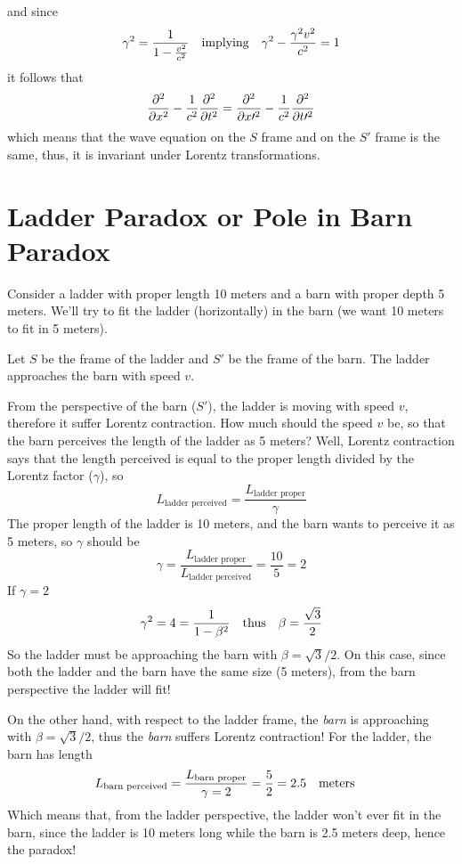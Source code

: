 \documentclass[oneside, 10pt, notitlepage]{book}
\begin{document}
and since
\begin{equation}\gamma^2 = \frac{1}{1-\frac{v^2}{c^2}} \qq{implying} \gamma^2 - \frac{\gamma^2 v^2}{c^2}=1\end{equation}
it follows that
\begin{equation}\pdv[2]{x} - \frac{1}{c^2}\pdv[2]{t} = \pdv[2]{x{\prime}} - \frac{1}{c^2}\pdv[2]{t{\prime}}\end{equation}
which means that the wave equation on the \(S\) frame and on the \(S{\prime}\) frame is the same, thus, it is invariant under Lorentz transformations. 

\section{Ladder Paradox or Pole in Barn Paradox}

Consider a ladder with proper length 10 meters and a barn with proper depth 5 meters. We'll try to fit the ladder (horizontally) in the barn (we want 10 meters to fit in 5 meters).

Let \(S\) be the frame of the ladder and \(S{\prime}\) be the frame of the barn. The ladder approaches the barn with speed \(v\). 

From the perspective of the barn (\(S{\prime}\)), the ladder is moving with speed \(v\), therefore it suffer Lorentz contraction. How much should the speed \(v\) be, so that the barn perceives the length of the ladder as 5 meters?  
Well, Lorentz contraction says that the length perceived is equal to the proper length divided by the Lorentz factor (\(\gamma\)), so
\begin{equation}L_{\text{ladder perceived}} = \frac{L_{\text{ladder proper}}}{\gamma}\end{equation}
The proper length of the ladder is 10 meters, and the barn wants to perceive it as 5 meters, so \(\gamma\) should be
\begin{equation}\gamma = \frac{L_{\text{ladder proper}}}{L_{\text{ladder perceived}}} = \frac{10}{5} = 2\end{equation}
If \(\gamma = 2\)
\begin{equation}\gamma^2 = 4 = \frac{1}{1-\beta^2} \qq{thus} \beta = \frac{\sqrt{3}}{2}\end{equation}
So the ladder must be approaching the barn with \(\beta = \sqrt{3}/2\). On this case, since both the ladder and the barn have the same size (5 meters), from the barn perspective the ladder will fit!  

On the other hand, with respect to the ladder frame, the \emph{barn} is approaching with \(\beta = \sqrt{3}/2\), thus the \emph{barn} suffers Lorentz contraction! For the ladder, the barn has length
\begin{equation}L_{\text{barn perceived}} = \frac{L_{\text{barn proper}}}{\gamma=2} = \frac{5}{2} = 2.5 \qq{meters}\end{equation}
Which means that, from the ladder perspective, the ladder won't ever fit in the barn, since the ladder is 10 meters long while the barn is 2.5 meters deep, hence the paradox!  
\end{document}
